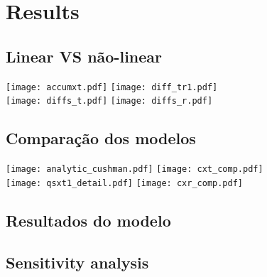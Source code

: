 \section{Results}

\subsection{Linear VS não-linear}
\begin{frame}
  \texttt{[image: accumxt.pdf]}
  \texttt{[image: diff\_tr1.pdf]}\\[.5cm]
  
  \texttt{[image: diffs\_t.pdf]}
  \texttt{[image: diffs\_r.pdf]}
\end{frame}

\subsection{Comparação dos modelos}
\begin{frame}
  \texttt{[image: analytic\_cushman.pdf]}
  \texttt{[image: cxt\_comp.pdf]}\\[.5cm]
  \texttt{[image: qsxt1\_detail.pdf]}
  \texttt{[image: cxr\_comp.pdf]}
\end{frame}

\subsection{Resultados do modelo}
\begin{frame}
\end{frame}

\subsection{Sensitivity analysis}
\begin{frame}
\end{frame}
